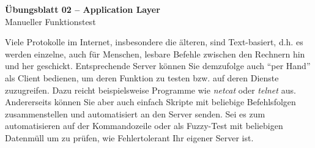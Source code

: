 \documentclass[paper=a4,fontsize=11pt]{scrartcl}%
\numberwithin{equation}{section}
\begin{document}
\begin{center}
\Large{\textbf{Übungsblatt 02 --  Application Layer}}\\
\large{Manueller Funktionstest}
\end{center}
Viele Protokolle im Internet, insbesondere die älteren, sind Text-basiert, d.h. es werden einzelne, auch für Menschen, lesbare Befehle zwischen den Rechnern hin und her geschickt. Entsprechende Server können Sie demzufolge auch \enquote{per Hand} als Client bedienen, um deren Funktion zu testen bzw. auf deren Dienste zuzugreifen. Dazu reicht beispielsweise Programme wie \emph{netcat} oder \emph{telnet} aus.\\
Andererseits können Sie  aber auch einfach Skripte mit beliebige Befehlsfolgen zusammenstellen und automatisiert an den Server senden. Sei es zum automatisieren auf der Kommandozeile oder als Fuzzy-Test mit beliebigen Datenmüll um zu prüfen, wie Fehlertolerant Ihr eigener Server ist.
\end{document}
